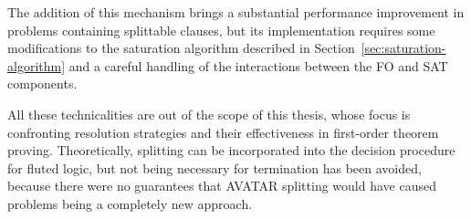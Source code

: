 The addition of this mechanism brings a substantial performance improvement in problems containing splittable clauses, but its implementation requires some modifications to the saturation algorithm described in Section~\ref{sec:saturation-algorithm} and a careful handling of the interactions between the FO and SAT components.

All these technicalities are out of the scope of this thesis, whose focus is confronting resolution strategies and their effectiveness in first-order theorem proving.
Theoretically, splitting can be incorporated into the decision procedure for fluted logic, but not being necessary for termination has been avoided, because there were no guarantees that AVATAR splitting would have caused problems being a completely new approach.
